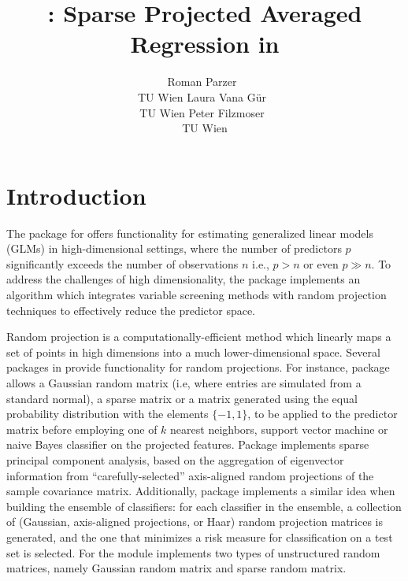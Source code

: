 \documentclass[
  article,
  nojss]{jss}
\author{Roman Parzer~\orcidlink{0000-0003-0893-3190}\\TU Wien \And Laura
Vana Gür~\orcidlink{0000-0002-9613-7604}\\TU Wien \AND Peter
Filzmoser~\orcidlink{0000-0002-8014-4682}\\TU Wien}
\title{\pkg{spar}: Sparse Projected Averaged Regression in \proglang{R}}
\begin{document}
\maketitle


\section{Introduction}\label{sec-intro}

The  package for  \citep{RLanguage} offers
functionality for estimating generalized linear models (GLMs) in
high-dimensional settings, where the number of predictors \(p\)
significantly exceeds the number of observations \(n\) i.e., \(p>n\) or
even \(p\gg n\). To address the challenges of high dimensionality, the
package implements an algorithm which integrates variable screening
methods with random projection techniques to effectively reduce the
predictor space.

Random projection is a computationally-efficient method which linearly
maps a set of points in high dimensions into a much lower-dimensional
space. Several packages in  provide functionality for random
projections. For instance, package 
\citep{RandProR, SIDDHARTH2020100629} allows a Gaussian random matrix
(i.e, where entries are simulated from a standard normal), a sparse
matrix \citep{ACHLIOPTAS2003JL, LiHastie2006VerySparseRP} or a matrix
generated using the equal probability distribution with the elements
\(\{-1,1\}\), to be applied to the predictor matrix before employing one
of \(k\) nearest neighbors, support vector machine or naive Bayes
classifier on the projected features. Package 
\citep{SPCAvRPR} implements sparse principal component analysis, based
on the aggregation of eigenvector information from
``carefully-selected'' axis-aligned random projections of the sample
covariance matrix. Additionally, package 
\citep{RPEnsembleR} implements a similar idea when building the ensemble
of classifiers: for each classifier in the ensemble, a collection of
(Gaussian, axis-aligned projections, or Haar) random projection matrices
is generated, and the one that minimizes a risk measure for
classification on a test set is selected. For 
\citep{Python} the  module
\citep{pedregosa2011scikit} implements two types of unstructured random
matrices, namely Gaussian random matrix and sparse random matrix.
\end{document}

